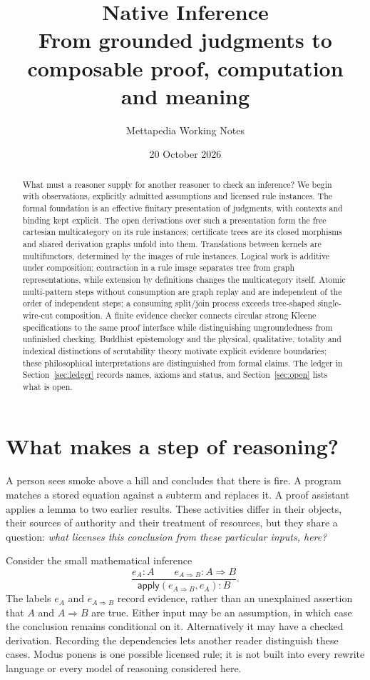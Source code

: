 \documentclass[11pt,a4paper]{article}
\title{\color{ink}Native Inference\\[3pt]
  \large From grounded judgments to composable proof, computation and meaning}
\author{Mettapedia Working Notes}
\date{20 October 2026}
\theoremstyle{plain}
\theoremstyle{definition}
\theoremstyle{remark}
\begin{document}
\maketitle

\begin{abstract}
What must a reasoner supply for another reasoner to check an inference? We
begin with observations, explicitly admitted assumptions and licensed rule
instances. The formal foundation is an effective finitary presentation of
judgments, with contexts and binding kept explicit. The open derivations over
such a presentation form the free cartesian
multicategory on its rule instances; certificate trees are its closed
morphisms and shared derivation graphs unfold into them. Translations between
kernels are multifunctors, determined by the images of rule instances. Logical
work is additive under composition; contraction in a rule image separates tree
from graph representations, while extension by definitions changes the
multicategory itself. Atomic multi-pattern steps without consumption are graph
replay and are independent of the order of independent steps; a consuming
split/join process exceeds tree-shaped single-wire-cut composition. A finite
evidence checker connects circular strong Kleene specifications to the same
proof interface while distinguishing ungroundedness from unfinished checking.
Buddhist epistemology and the physical, qualitative, totality and indexical
distinctions of scrutability theory motivate explicit evidence boundaries;
these philosophical interpretations are distinguished from formal claims. The
ledger in Section~\ref{sec:ledger} records names, axioms and status, and
Section~\ref{sec:open} lists what is open.
\end{abstract}

\tableofcontents

\section{What makes a step of reasoning?}\label{sec:intuition}

A person sees smoke above a hill and concludes that there is fire. A program
matches a stored equation against a subterm and replaces it. A proof assistant
applies a lemma to two earlier results. These activities differ in their
objects, their sources of authority and their treatment of resources, but
they share a question: \emph{what licenses this conclusion from these particular
inputs, here?}

Consider the small mathematical inference
\[
 \frac{e_A : A \qquad e_{A\Rightarrow B} : A\Rightarrow B}
      {\mathsf{apply}(e_{A\Rightarrow B},e_A) : B}.
\]
The labels $e_A$ and $e_{A\Rightarrow B}$ record evidence, rather than an
unexplained assertion that $A$ and $A\Rightarrow B$ are true. Either input may
be an assumption, in which case the conclusion remains conditional on it.
Alternatively it may have a checked derivation. Recording the dependencies
lets another reader distinguish these cases. Modus ponens is one possible
licensed rule; it is not built into every rewrite language or every model of
reasoning considered here.
\end{document}

